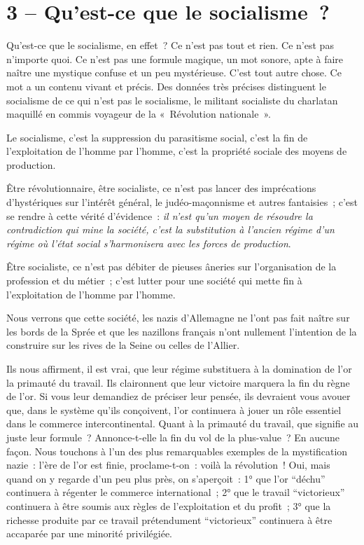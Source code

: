 \documentclass[french,twoside]{book} %
\begin{document}
\section[3 – Qu’est-ce que le socialisme ?]{3 – Qu’est-ce que le socialisme ?}
\noindent Qu’est-ce que le socialisme, en effet ? Ce n’est pas tout et rien. Ce n’est pas n’importe quoi. Ce n’est pas une formule magique, un mot sonore, apte à faire naître une mystique confuse et un peu mystérieuse. C’est tout autre chose. Ce mot a un contenu vivant et précis. Des données très précises distinguent le socialisme de ce qui n’est pas le socialisme, le militant socialiste du charlatan maquillé en commis voyageur de la « Révolution nationale ».\par
Le socialisme, c’est la suppression du parasitisme social, c’est la fin de l’exploitation de l’homme par l’homme, c’est la propriété sociale des moyens de production.\par
Être révolutionnaire, être socialiste, ce n’est pas lancer des imprécations d’hystériques sur l’intérêt général, le judéo-maçonnisme et autres fantaisies ; c’est se rendre à cette vérité d’évidence : \emph{il n’est qu’un moyen de résoudre la contradiction qui mine la société, c’est la substitution à l’ancien régime d’un régime où l’état social s’harmonisera avec les forces de production}.\par
Être socialiste, ce n’est pas débiter de pieuses âneries sur l’organisation de la profession et du métier ; c’est lutter pour une société qui mette fin à l’exploitation de l’homme par l’homme.\par
Nous verrons que cette société, les nazis d’Allemagne ne l’ont pas fait naître sur les bords de la Sprée et que les nazillons   français n’ont nullement l’intention de la construire sur les rives de la Seine ou celles de l’Allier.\par
Ils nous affirment, il est vrai, que leur régime substituera à la domination de l’or la primauté du travail. Ils claironnent que leur victoire marquera la fin du règne de l’or. Si vous leur demandiez de préciser leur pensée, ils devraient vous avouer que, dans le système qu’ils conçoivent, l’or continuera à jouer un rôle essentiel dans le commerce intercontinental. Quant à la primauté du travail, que signifie au juste leur formule ? Annonce-t-elle la fin du vol de la plus-value ? En aucune façon. Nous touchons à l’un des plus remarquables exemples de la mystification nazie : l’ère de l’or est finie, proclame-t-on : voilà la révolution ! Oui, mais quand on y regarde d’un peu plus près, on s’aperçoit : 1° que l’or “déchu” continuera à régenter le commerce international ; 2° que le travail “victorieux” continuera à être soumis aux règles de l’exploitation et du profit ; 3° que la richesse produite par ce travail prétendument “victorieux” continuera à être accaparée par une minorité privilégiée.\par
\end{document}
